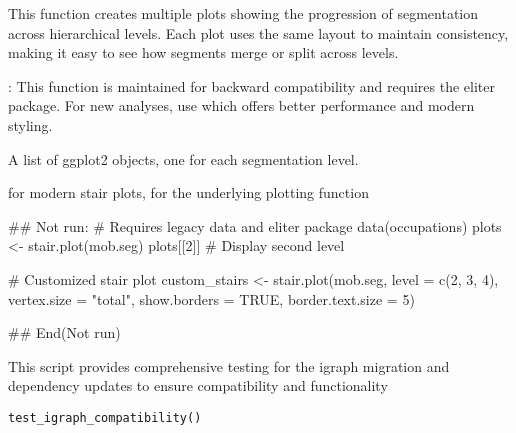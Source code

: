 \documentclass[a4paper]{book}
\begin{document}
%
\begin{Details}
This function creates multiple plots showing the progression of segmentation
across hierarchical levels. Each plot uses the same layout to maintain
consistency, making it easy to see how segments merge or split across levels.

: This function is maintained for backward compatibility and
requires the eliter package. For new analyses, use 
which offers better performance and modern styling.
\end{Details}
%
\begin{Value}
A list of ggplot2 objects, one for each segmentation level.
\end{Value}
%
\begin{SeeAlso}
 for modern stair plots,
 for the underlying plotting function
\end{SeeAlso}
%
\begin{Examples}
\begin{ExampleCode}
## Not run: 
# Requires legacy data and eliter package
data(occupations)
plots <- stair.plot(mob.seg)
plots[[2]]  # Display second level

# Customized stair plot
custom_stairs <- stair.plot(mob.seg,
                           level = c(2, 3, 4),
                           vertex.size = "total",
                           show.borders = TRUE,
                           border.text.size = 5)

## End(Not run)

\end{ExampleCode}
\end{Examples}
%
\begin{Description}
This script provides comprehensive testing for the igraph migration
and dependency updates to ensure compatibility and functionality
\end{Description}
%
\begin{Usage}
\begin{verbatim}
test_igraph_compatibility()
\end{verbatim}
\end{Usage}
\end{document}
